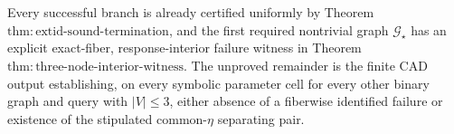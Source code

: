 Every successful branch is already certified uniformly by Theorem \(\mathrm{thm{:}extid\text{-}sound\text{-}termination}\), and the first required nontrivial graph \(\mathcal G_\star\) has an explicit exact-fiber, response-interior failure witness in Theorem \(\mathrm{thm{:}three\text{-}node\text{-}interior\text{-}witness}\).  The unproved remainder is the finite CAD output establishing, on every symbolic parameter cell for every other binary graph and query with \(\lvert V\rvert\leq3\), either absence of a fiberwise identified failure or existence of the stipulated common-\(\eta\) separating pair.